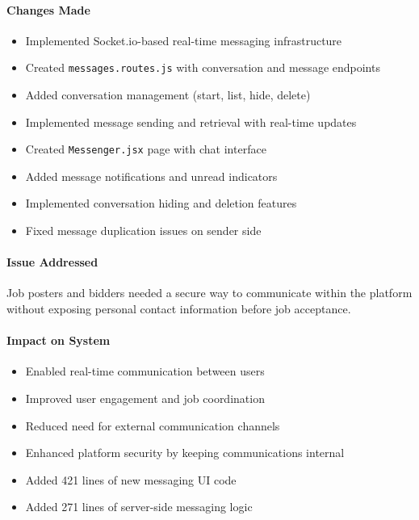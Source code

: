 \documentclass[11pt]{article}
\begin{document}
\paragraph{Changes Made}
\begin{itemize}[leftmargin=1.4em]
  \item Implemented Socket.io-based real-time messaging infrastructure
  \item Created \texttt{messages.routes.js} with conversation and message endpoints
  \item Added conversation management (start, list, hide, delete)
  \item Implemented message sending and retrieval with real-time updates
  \item Created \texttt{Messenger.jsx} page with chat interface
  \item Added message notifications and unread indicators
  \item Implemented conversation hiding and deletion features
  \item Fixed message duplication issues on sender side
\end{itemize}

\paragraph{Issue Addressed}
Job posters and bidders needed a secure way to communicate within the platform without exposing personal contact information before job acceptance.

\paragraph{Impact on System}
\begin{itemize}[leftmargin=1.4em]
  \item Enabled real-time communication between users
  \item Improved user engagement and job coordination
  \item Reduced need for external communication channels
  \item Enhanced platform security by keeping communications internal
  \item Added 421 lines of new messaging UI code
  \item Added 271 lines of server-side messaging logic
\end{itemize}
\end{document}
